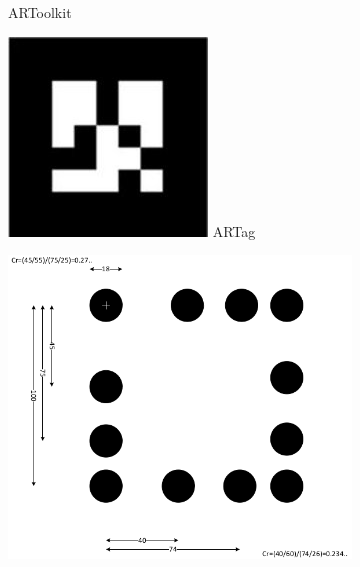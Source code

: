\documentclass[runningheads]{llncs}
\begin{document}
\begin{figure}
\begin{subfigure}[b]{0.19\textwidth}
  ARToolkit\cite{ARToolkit02}  
 \end{subfigure}
 \begin{subfigure}[b]{0.19\textwidth}
  \centering
  \includegraphics[width=\linewidth]{ARtag.jpg}
  ARTag\cite{Fiala05}
 \end{subfigure} 
 \begin{subfigure}[b]{0.19\textwidth}
  \centering
  \includegraphics[width=\linewidth]{pifiducial.png}

\end{subfigure}
\end{figure}
\end{document}
